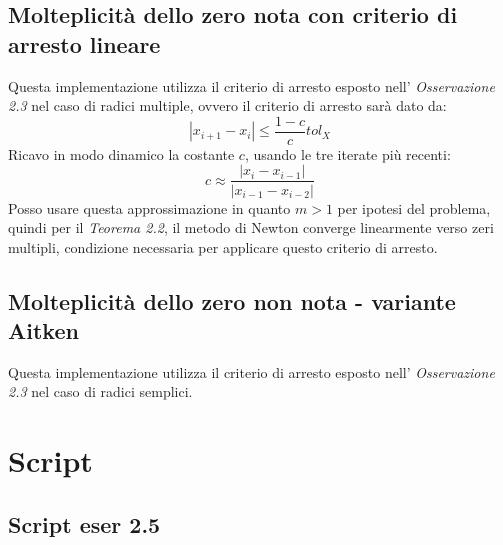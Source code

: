 \subsection{Molteplicit\`a dello zero nota con criterio di arresto lineare}
\label{subsec:newtonMethodMultKnownLinearStopCriteria}
Questa implementazione utilizza il criterio di arresto esposto nell'
\emph{Osservazione 2.3} nel caso di radici multiple, ovvero il criterio di
arresto sar\`a dato da:
\begin{displaymath}
	|x_{i+1} - x_{i}| \leq \frac{1-c}{c}tol_{X}
\end{displaymath}
Ricavo in modo dinamico la costante $c$, usando le tre iterate pi\`u recenti:
\begin{displaymath}
	c \approx \frac{|x_{i} - x_{i-1}|}{|x_{i-1} - x_{i-2}|}
\end{displaymath}
Posso usare questa approssimazione in quanto $m > 1$ per ipotesi del problema,
quindi per il \emph{Teorema 2.2}, il metodo di Newton converge linearmente verso zeri
multipli, 
condizione necessaria per applicare questo criterio di arresto.


\subsection{Molteplicit\`a dello zero non nota - variante Aitken}
\label{subsec:newtonMethodAitken}
Questa implementazione utilizza il criterio di arresto esposto nell'
\emph{Osservazione 2.3} nel caso di radici semplici.


\section{Script}
\subsection{Script eser 2.5}
\label{subsec:ScriptEser25}


